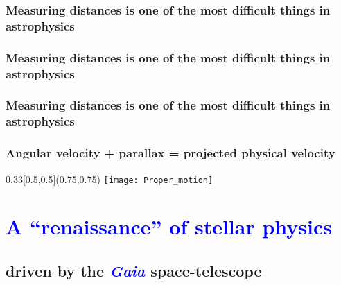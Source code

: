 \documentclass[xcolor=dvipsnames,professionalfonts, aspectratio=169]{beamer}
\begin{document}
\bgroup
\begin{frame}
  \frametitle{Measuring distances is one of the most difficult things
    in astrophysics}

\end{frame}

\egroup
\bgroup
\begin{frame}
  \frametitle{Measuring distances is one of the most difficult things
    in astrophysics}

\end{frame}
\egroup
\bgroup
\begin{frame}
  \frametitle{Measuring distances is one of the most difficult things
    in astrophysics}

\end{frame}
\egroup
\bgroup
\begin{frame}
  \frametitle{Angular velocity + parallax = projected physical velocity}

  \begin{textblock}{0.33}[0.5,0.5](0.75,0.75)
    \texttt{[image: Proper\_motion]}
  \end{textblock}


\end{frame}
\egroup




\section{\textcolor{Blue}{A ``renaissance'' of stellar physics}}
\subsection{driven by the \textcolor{Blue}{\emph{Gaia}} space-telescope}
\end{document}
